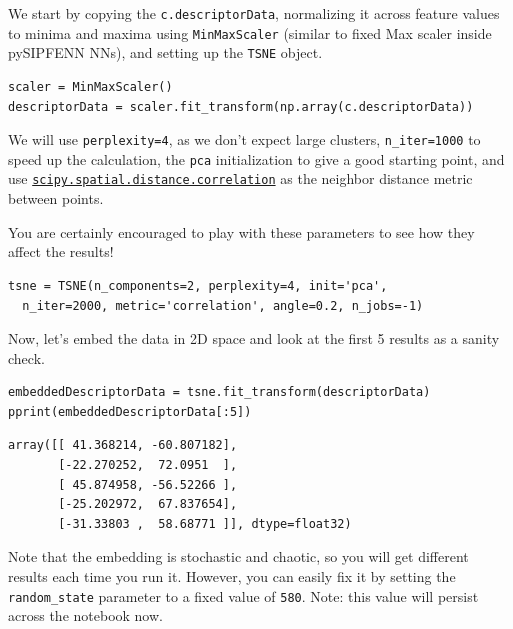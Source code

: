 We start by copying the \texttt{c.descriptorData},
normalizing it across feature values to minima and maxima using
\texttt{MinMaxScaler} (similar to fixed Max scaler
inside pySIPFENN NNs), and setting up the \texttt{TSNE}
object.

\begin{verbatim}
scaler = MinMaxScaler()
descriptorData = scaler.fit_transform(np.array(c.descriptorData))
\end{verbatim}

We will use \texttt{perplexity=4}, as we don't expect
large clusters, \texttt{n\_iter=1000} to speed up the
calculation, the \texttt{pca} initialization to give a
good starting point, and use
\href{https://docs.scipy.org/doc/scipy/reference/generated/scipy.spatial.distance.correlation.html\#scipy.spatial.distance.correlation}{\texttt{scipy.spatial.distance.correlation}}
as the neighbor distance metric between points.

You are certainly encouraged to play with these parameters to see how
they affect the results!

\begin{verbatim}
tsne = TSNE(n_components=2, perplexity=4, init='pca', 
  n_iter=2000, metric='correlation', angle=0.2, n_jobs=-1)
\end{verbatim}

Now, let's embed the data in 2D space and look at the first 5 results as
a sanity check.

\begin{verbatim}
embeddedDescriptorData = tsne.fit_transform(descriptorData)
pprint(embeddedDescriptorData[:5])
\end{verbatim}

\begin{verbatim}
array([[ 41.368214, -60.807182],
       [-22.270252,  72.0951  ],
       [ 45.874958, -56.52266 ],
       [-25.202972,  67.837654],
       [-31.33803 ,  58.68771 ]], dtype=float32)
\end{verbatim}

Note that the embedding is stochastic and chaotic, so you will get
different results each time you run it. However, you can easily fix it
by setting the \texttt{random\_state} parameter to a
fixed value of \texttt{580}. Note: this value will
persist across the notebook now.

